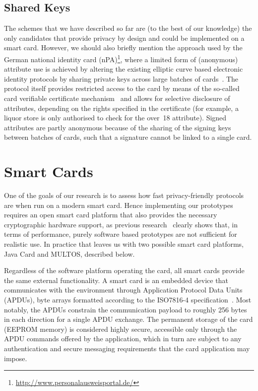 \subsection{Shared Keys\label{sec:nPA}}

The schemes that we have described so far are (to the best of our knowledge) the
only candidates that provide privacy by design and could be implemented on a
smart card. However, we should also briefly mention the approach used by
the German national identity card (nPA)\footnote{\url{http://www.personalausweisportal.de/}},
where a limited form of (anonymous) attribute use is
achieved by altering the existing elliptic curve based electronic identity
protocols by sharing private keys across large batches of
cards~\cite{Kugler2010}. The protocol itself provides restricted access to the
card by means of the so-called card verifiable certificate
mechanism~\cite{EAC20} and allows for selective disclosure of attributes,
depending on the rights specified in the certificate (for example, a liquor
store is only authorised to check for the \textsf{over~18} attribute). Signed
attributes are partly anonymous because of the sharing of the signing keys
between batches of cards, such that a signature cannot be linked to a single
card.

\section{Smart Cards\label{sec:smartcards}}

One of the goals of our research is to assess how fast privacy-friendly
protocols are when run on a modern smart card. Hence implementing our prototypes
requires an open smart card platform that also provides the necessary
cryptographic hardware support, as previous research~\cite{TewsJacobs09} clearly
shows that, in terms of performance, purely software based prototypes are not
sufficient for realistic use. In practice that leaves us with two possible smart
card platforms, Java Card and MULTOS, described below.

Regardless of the software platform operating the card, all smart cards provide
the same external functionality. A smart card is an embedded device that
communicates with the environment through Application Protocol Data Units
(APDUs), byte arrays formatted according to the ISO7816-4
specification~\cite{ISO7816_4}. Most notably, the APDUs constrain the
communication payload to roughly 256 bytes in each direction for a single APDU
exchange. The permanent storage of the card (EEPROM memory) is considered
highly secure, accessible only through the APDU commands offered by the
application, which in turn are subject to any authentication and secure
messaging requirements that the card application may impose.


